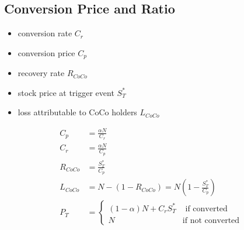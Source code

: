 \subsection{Conversion Price and Ratio}
\begin{itemize}
    \item conversion rate $C_r$
    \item conversion price $C_p$
    \item recovery rate $R_{CoCo}$
    \item stock price at trigger event $S_T^{*}$
    \item loss attributable to CoCo holders $L_{CoCo}$
\end{itemize}

\begin{align}
    C_p &= \frac{\alpha N}{C_r}\\
    C_r &= \frac{\alpha N}{C_p}\\
    R_{CoCo} &= \frac{S_T^{*} }{C_p}\\
    L_{CoCo} &= N - ( 1 - R_{CoCo}) = N \left( 1 - \frac{S_T^{*}}{C_p} \right)\\
    P_T &= \begin{cases} (1 - \alpha) N + C_r S_T^{*} & \text{ if converted} \\ N & \text{if not converted} \end{cases}
\end{align}

